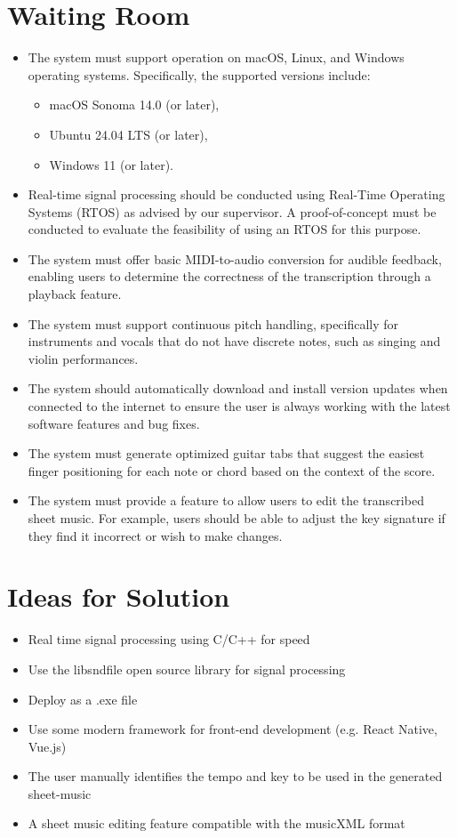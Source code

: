 \documentclass[12pt]{article}
\begin{document}
\section{Waiting Room}
\begin{itemize}
    \item The system must support operation on macOS, Linux, and Windows operating systems. Specifically, the supported versions include:
    \begin{itemize}
        \item macOS Sonoma 14.0 (or later),
        \item Ubuntu 24.04 LTS (or later),
        \item Windows 11 (or later).
    \end{itemize}
    \item Real-time signal processing should be conducted using Real-Time Operating Systems (RTOS) as advised by our supervisor. A proof-of-concept must be conducted to evaluate the feasibility of using an RTOS for this purpose.
    \item The system must offer basic MIDI-to-audio conversion for audible feedback, enabling users to determine the correctness of the transcription through a playback feature.
    \item The system must support continuous pitch handling, specifically for instruments and vocals that do not have discrete notes, such as singing and violin performances.
    \item The system should automatically download and install version updates when connected to the internet to ensure the user is always working with the latest software features and bug fixes.
    \item The system must generate optimized guitar tabs that suggest the easiest finger positioning for each note or chord based on the context of the score.
    \item The system must provide a feature to allow users to edit the transcribed sheet music. For example, users should be able to adjust the key signature if they find it incorrect or wish to make changes.
\end{itemize}

\section{Ideas for Solution}
\begin{itemize}
  \item Real time signal processing using C/C++ for speed
  \item Use the libsndfile open source library for signal processing
  \item Deploy as a .exe file
  \item Use some modern framework for front-end development (e.g. React Native, Vue.js)
  \item The user manually identifies the tempo and key to be used in the generated sheet-music
  \item A sheet music editing feature compatible with the musicXML format
\end{itemize}
\end{document}
